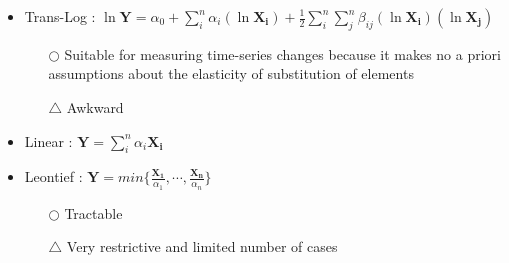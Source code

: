 \documentclass[aspectratio=169, dvipdfmx, 11pt]{beamer}
\begin{document}
\begin{frame}
    \begin{itemize}
        \setlength{\itemsep}{3mm}
        \item Trans-Log : $\ln{\bm{Y}}={\alpha_{0}}+\sum\limits_{i}^{n} \alpha_{i}(\ln{\bm{X_{i}}})+{\frac{1}{2}}\sum\limits_{i}^{n}\sum\limits_{j}^{n} {\beta_{ij}}(\ln{\bm{X_{i}}})(\ln{\bm{X_{j}}})$
              \begin{itemize}
                  \setlength{\itemsep}{.1in}
                  \item[$\bigcirc$] {\color{blue} Suitable for measuring time-series changes because it makes no a priori assumptions about the elasticity of substitution of elements}
                  \item[$\bigtriangleup$] {\color{red} Awkward}
              \end{itemize}
        \item Linear : $\bm{Y}=\sum\limits_{i}^{n} {\alpha_{i}}{\bm{X_{i}}}$
              \vspace{-4mm}
        \item Leontief : $\bm{Y}=min\{{\frac{\bm{X_{1}}}{\alpha_{1}}}, \cdots, {\frac{\bm{X_{n}}}{\alpha_{n}}}\}$
              \begin{itemize}
                  \setlength{\itemsep}{.1in}
                  \vspace{2mm}
                  \item[$\bigcirc$] {\color{blue} Tractable}
                  \item[$\bigtriangleup$] {\color{red} Very restrictive and limited number of cases}
              \end{itemize}
    \end{itemize}
\end{frame}
\end{document}
